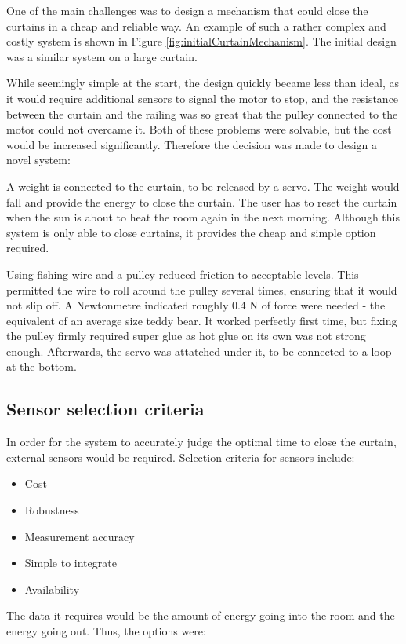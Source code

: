 \documentclass[a4paper,12pt]{article}
\begin{document}
One of the main challenges was to design a mechanism that could close the curtains in a cheap and reliable way. 
An example of such a rather complex and costly system is shown in Figure \ref{fig:initialCurtainMechanism}.
The initial design was a similar system on a large curtain.

While seemingly simple at the start, the design quickly became less than ideal, as it would require additional sensors to signal the motor to stop, 
and the resistance between the curtain and the railing was so great that the pulley connected to the motor could not overcame it. Both of these problems were solvable, 
but the cost would be increased significantly. Therefore the decision was made to design a novel system:

A weight is connected to the curtain, to be released by a servo. The weight would fall and provide the energy to close the curtain. 
The user has to reset the curtain when the sun is about to heat the room again in the next morning. Although this system is only able to close curtains, 
it provides the cheap and simple option required.

Using fishing wire and a pulley reduced friction to acceptable levels. This permitted the wire to roll around the pulley several times, ensuring that it would not slip off. 
A Newtonmetre indicated roughly 0.4 N of force were needed  - the equivalent of an average size teddy bear. It worked perfectly first time, but fixing the pulley firmly 
required super glue as hot glue on its own was not strong enough. Afterwards, the servo was attatched under it, to be connected to a loop at the bottom.


\subsection{Sensor selection criteria}

In order for the system to accurately judge the optimal time to close the curtain, external sensors would be required.
Selection criteria for sensors include:
\begin{itemize}
    \item Cost
    \item Robustness
    \item Measurement accuracy
    \item Simple to integrate
    \item Availability
\end{itemize}

The data it requires would be the amount of energy going into the room and the energy going out. Thus, the options were:
\end{document}
